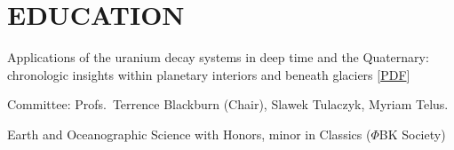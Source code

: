 \section{EDUCATION}

Applications of the uranium decay systems in deep time and the Quaternary: chronologic insights within planetary interiors and beneath glaciers [\href{https://escholarship.org/uc/item/0vp7r59z}{PDF}]

\quad Committee: Profs.~Terrence Blackburn (Chair), Slawek Tulaczyk, Myriam Telus.

Earth and Oceanographic Science with Honors, minor in Classics ($\Phi$BK Society)